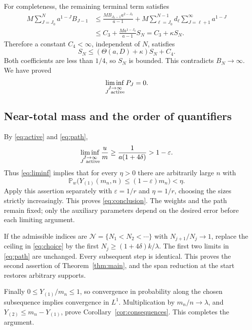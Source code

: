 \documentclass[11pt]{article}
\theoremstyle{remark}\newtheorem{remark}[theorem]{Remark}
\newcommand{\Pp}{\mathbb P}
\begin{document}
For completeness, the remaining terminal term satisfies
\begin{align*}
 M\sum_{J=J_0}^N a^{1-J}B_{J-1}
 &\le\frac{MB_{J_0-1}a^{2-J_0}}{a-1}
    +M\sum_{\ell=J_0}^{N-1}d_\ell
                   \sum_{J=\ell+1}^{\infty}a^{1-J}\\
 &\le C_3+\frac{Ma^{1-J_0}}{a-1}S_N
 =C_3+\kappa S_N.
\end{align*}
Therefore a constant $C_4<\infty$, independent of $N$, satisfies
\begin{equation}\label{eq:contradiction}
 S_N\le(\Theta(a,D)+\kappa)S_N+C_4.
\end{equation}
Both coefficients are less than $1/4$, so $S_N$ is bounded. This contradicts
$B_N\to\infty$. We have proved
\begin{equation}\label{eq:liminf}
 \liminf_{\substack{J\to\infty\\J\ {\rm active}}}P_J=0.
\end{equation}

\subsection{Near-total mass and the order of quantifiers}
By \eqref{eq:active} and \eqref{eq:path},
\[
 \liminf_{\substack{J\to\infty\\J\ {\rm active}}}\frac{u}{m}
 \ge\frac1{a(1+4\delta)}>1-\varepsilon.
\]
Thus \eqref{eq:liminf} implies that for every $\eta>0$ there are arbitrarily
large $n$ with
\[
 \Pp_w\bigl(Y_{(1)}(m_n,n)\le(1-\varepsilon)m_n\bigr)<\eta.
\]
Apply this assertion separately with $\varepsilon=1/r$ and $\eta=1/r$,
choosing the sizes strictly increasingly. This proves \eqref{eq:conclusion}.
The weights and the path remain fixed; only the auxiliary parameters depend
on the desired error before each limiting argument.

If the admissible indices are $\mathcal N=\{N_1<N_2<\cdots\}$ with
$N_{j+1}/N_j\to1$, replace the ceiling in \eqref{eq:choice} by the first
$N_j\ge(1+4\delta)k/\lambda$. The first two limits in \eqref{eq:path} are
unchanged. Every subsequent step is identical. This proves the second
assertion of Theorem~\ref{thm:main}, and the span reduction at the start
restores arbitrary supports.

Finally $0\le Y_{(1)}/m_n\le1$, so convergence in probability along the
chosen subsequence implies convergence in $L^1$. Multiplication by
$m_n/n\to\lambda$, and $Y_{(2)}\le m_n-Y_{(1)}$, prove
Corollary~\ref{cor:consequences}. This completes the argument.
\end{document}
